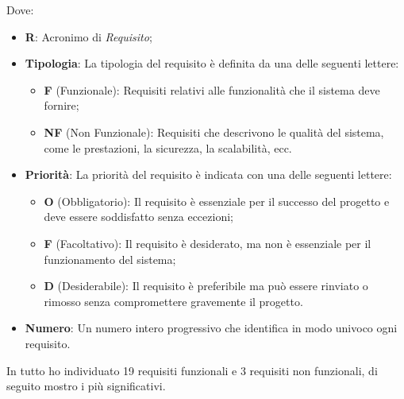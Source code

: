 Dove:
\begin{itemize}
    \item \textbf{R}: Acronimo di \textit{Requisito};
    \item \textbf{Tipologia}: La tipologia del requisito è definita da una delle seguenti lettere:
        \begin{itemize}
            \item \textbf{F} (Funzionale): Requisiti relativi alle funzionalità che il sistema deve fornire;
            \item \textbf{NF} (Non Funzionale): Requisiti che descrivono le qualità del sistema, come le prestazioni, la sicurezza, la scalabilità, ecc.
        \end{itemize}
    \item \textbf{Priorità}: La priorità del requisito è indicata con una delle seguenti lettere:
        \begin{itemize}
            \item \textbf{O} (Obbligatorio): Il requisito è essenziale per il successo del progetto e deve essere soddisfatto senza eccezioni;
            \item \textbf{F} (Facoltativo): Il requisito è desiderato, ma non è essenziale per il funzionamento del sistema;
            \item \textbf{D} (Desiderabile): Il requisito è preferibile ma può essere rinviato o rimosso senza compromettere gravemente il progetto.
        \end{itemize}
    \item \textbf{Numero}: Un numero intero progressivo che identifica in modo univoco ogni requisito.
\end{itemize}

\noindent In tutto ho individuato 19 requisiti funzionali e 3 requisiti non funzionali, di seguito mostro i più significativi.
